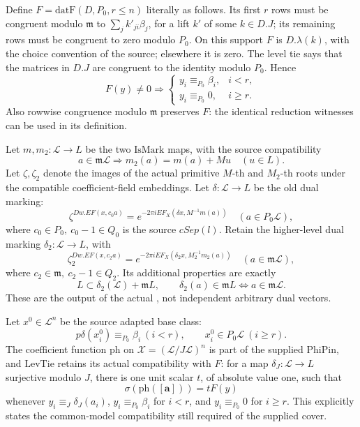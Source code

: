 Define \(F=\mathrm{datF}(D,P_0,r\leq n)\) literally as follows.
Its first \(r\) rows must be congruent modulo \(\mathfrak m\)
to \(\sum_jk'_{ji}\beta_j\), for a lift \(k'\) of some \(k\in D.J\);
its remaining rows must be congruent to zero modulo \(P_0\).
On this support \(F\) is \(D.\lambda(k)\), with the choice
convention of the source; elsewhere it is zero.
The level tie says that the matrices in \(D.J\) are congruent to
the identity modulo \(P_0\). Hence
\[
 F(y)\ne0\Longrightarrow
 \begin{cases}
 y_i\equiv_{P_0}\beta_i,&i<r,\\
 y_i\equiv_{P_0}0,&i\geq r.
 \end{cases}                                             \tag{CFo4}
\]
Also rowwise congruence modulo \(\mathfrak m\) preserves \(F\):
the identical reduction witnesses can be used in its definition.

Let \(m,m_2:\mathcal L\to L\) be the two \(\mathrm{IsMark}\)
maps, with the source compatibility
\[
 a\in\mathfrak m\mathcal L
       \Longrightarrow m_2(a)=m(a)+Mu\quad(u\in L).        \tag{CFo5}
\]
Let \(\zeta,\zeta_2\) denote the images of the actual primitive
\(M\)-th and \(M_2\)-th roots under the compatible coefficient-field
embeddings. Let \(\delta:\mathcal L\to L\) be the old dual marking:
\[
 \zeta^{Dw.EF(x,c_0a)}
           =e^{-2\pi iEF_X(\delta x,M^{-1}m(a))}
                                      \quad(a\in P_0\mathcal L),
                                                               \tag{CFo6}
\]
where \(c_0\in P_0,\ c_0-1\in Q_0\) is the source \(cSep(l)\).
Retain the higher-level dual marking \(\delta_2:\mathcal L\to L\),
with
\[
 \zeta_2^{Dw.EF(x,c_2a)}
           =e^{-2\pi iEF_X(\delta_2x,M_2^{-1}m_2(a))}
                                     \quad(a\in\mathfrak m\mathcal L),
                                                               \tag{CFo7}
\]
where \(c_2\in\mathfrak m,\ c_2-1\in Q_2\). Its additional
properties are exactly
\[
 L\subset\delta_2(\mathcal L)+\mathfrak mL,\qquad
 \delta_2(a)\in\mathfrak mL
                        \Longleftrightarrow a\in\mathfrak m\mathcal L.
                                                               \tag{CFo8}
\]
These are the output of the actual
,
not independent arbitrary dual vectors.

Let \(x^0\in\mathcal L^n\) be the source adapted base class:
\[
 p\delta(x^0_i)\equiv_{P_0}\beta_i\ (i<r),\qquad
                          x^0_i\in P_0\mathcal L\ (i\geq r).
                                                               \tag{CFo9}
\]
The coefficient function \(\mathrm{ph}\) on
\(\mathcal X=(\mathcal L/J\mathcal L)^n\) is part of the supplied
\(\mathrm{PhiPin}\), and \(\mathrm{LevTie}\) retains its actual
compatibility with \(F\): for a map
\(\delta_J:\mathcal L\to L\) surjective modulo \(J\), there is
one unit scalar \(t\), of absolute value one, such that
\[
 \sigma(\mathrm{ph}([\mathbf a]))
                      =tF(y)                            \tag{CFo10}
\]
whenever \(y_i\equiv_J\delta_J(a_i)\), \(y_i\equiv_{P_0}\beta_i\)
for \(i<r\), and \(y_i\equiv_{P_0}0\) for \(i\geq r\).
This explicitly states the common-model compatibility still
required of the supplied cover.


